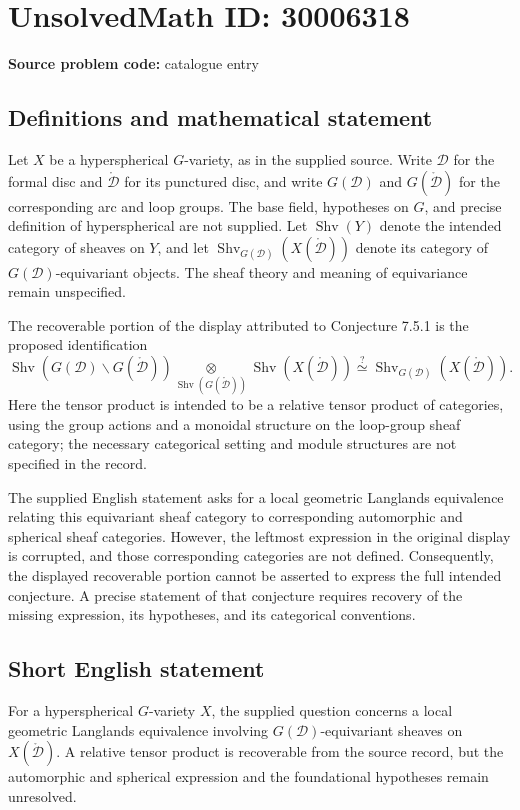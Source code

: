 \documentclass[11pt]{article}
\begin{document}
\section*{UnsolvedMath ID: 30006318}
\textbf{Source problem code:} catalogue entry
\subsection{Definitions and mathematical statement}
Let \(X\) be a hyperspherical \(G\)-variety, as in the supplied source. Write \(\mathcal D\) for the formal disc and \(\mathring{\mathcal D}\) for its punctured disc, and write \(G(\mathcal D)\) and \(G(\mathring{\mathcal D})\) for the corresponding arc and loop groups. The base field, hypotheses on \(G\), and precise definition of hyperspherical are not supplied. Let \(\operatorname{Shv}(Y)\) denote the intended category of sheaves on \(Y\), and let \(\operatorname{Shv}_{G(\mathcal D)}(X(\mathring{\mathcal D}))\) denote its category of \(G(\mathcal D)\)-equivariant objects. The sheaf theory and meaning of equivariance remain unspecified.

The recoverable portion of the display attributed to Conjecture 7.5.1 is the proposed identification
\[
\operatorname{Shv}\!\left(G(\mathcal D)\backslash G(\mathring{\mathcal D})\right)
\underset{\operatorname{Shv}(G(\mathring{\mathcal D}))}{\otimes}
\operatorname{Shv}\!\left(X(\mathring{\mathcal D})\right)
\overset{?}{\simeq}
\operatorname{Shv}_{G(\mathcal D)}\!\left(X(\mathring{\mathcal D})\right).
\]
Here the tensor product is intended to be a relative tensor product of categories, using the group actions and a monoidal structure on the loop-group sheaf category; the necessary categorical setting and module structures are not specified in the record.

The supplied English statement asks for a local geometric Langlands equivalence relating this equivariant sheaf category to corresponding automorphic and spherical sheaf categories. However, the leftmost expression in the original display is corrupted, and those corresponding categories are not defined. Consequently, the displayed recoverable portion cannot be asserted to express the full intended conjecture. A precise statement of that conjecture requires recovery of the missing expression, its hypotheses, and its categorical conventions.
\subsection{Short English statement}
For a hyperspherical \(G\)-variety \(X\), the supplied question concerns a local geometric Langlands equivalence involving \(G(\mathcal D)\)-equivariant sheaves on \(X(\mathring{\mathcal D})\). A relative tensor product is recoverable from the source record, but the automorphic and spherical expression and the foundational hypotheses remain unresolved.
\end{document}
